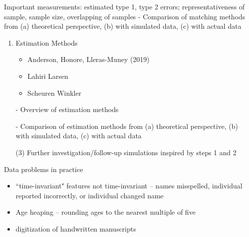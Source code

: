 \documentclass[12pt]{article}
\begin{document}
Important measurements:  estimated type 1, type 2 errors; representativeness of sample, sample size, overlapping of samples 
- Comparison of matching methods from (a) theoretical perspective, (b) with simulated data, (c) with actual data
\begin{enumerate}
\item  Estimation Methods 
\begin{itemize}
\item Anderson, Honore, Lleras-Muney (2019)
\item Lahiri Larsen
\item Scheuren Winkler 
\end{itemize}
- Overview of estimation methods


- Comparison of estimation methods from (a) theoretical perspective, (b) with simulated data, (c) with actual data

(3) Further investigation/follow-up simulations inspired by steps 1 and 2  
\end{enumerate}










Data problems in practice \cite{bailey2017}
\begin{itemize}
\item ``time-invariant" features not time-invariant -- names misspelled, individual reported incorrectly, or individual changed name 
\item Age heaping -- rounding ages to the nearest multiple of five
\item digitization of handwritten manuscripts 
\end{itemize}
\end{document}
